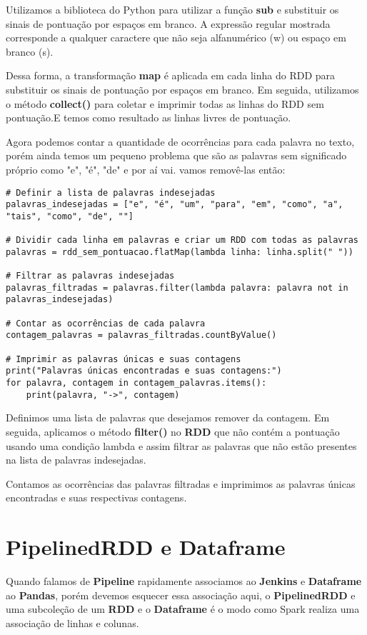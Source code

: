 Utilizamos a biblioteca do Python para utilizar a função \textbf{sub} e substituir os sinais de pontuação por espaços em branco. A expressão regular mostrada corresponde a qualquer caractere que não seja alfanumérico (w) ou espaço em branco (s).

Dessa forma, a transformação \textbf{map} é aplicada em cada linha do RDD para substituir os sinais de pontuação por espaços em branco. Em seguida, utilizamos o método \textbf{collect()} para coletar e imprimir todas as linhas do RDD sem pontuação.E temos como resultado as linhas livres de pontuação.

Agora podemos contar a quantidade de ocorrências para cada palavra no texto, porém ainda temos um pequeno problema que são as palavras sem significado próprio como "e", "é", "de" e por aí vai. vamos removê-las então:
\begin{lstlisting}[]
# Definir a lista de palavras indesejadas
palavras_indesejadas = ["e", "é", "um", "para", "em", "como", "a", "tais", "como", "de", ""]

# Dividir cada linha em palavras e criar um RDD com todas as palavras
palavras = rdd_sem_pontuacao.flatMap(lambda linha: linha.split(" "))

# Filtrar as palavras indesejadas
palavras_filtradas = palavras.filter(lambda palavra: palavra not in palavras_indesejadas)

# Contar as ocorrências de cada palavra
contagem_palavras = palavras_filtradas.countByValue()

# Imprimir as palavras únicas e suas contagens
print("Palavras únicas encontradas e suas contagens:")
for palavra, contagem in contagem_palavras.items():
    print(palavra, "->", contagem)
\end{lstlisting}

Definimos uma lista de palavras que desejamos remover da contagem. Em seguida, aplicamos o método \textbf{filter()} no \textbf{RDD} que não contém a pontuação usando uma condição lambda e assim filtrar as palavras que não estão presentes na lista de palavras indesejadas.

Contamos as ocorrências das palavras filtradas e imprimimos as palavras únicas encontradas e suas respectivas contagens.

\section{PipelinedRDD e Dataframe}
Quando falamos de \textbf{Pipeline} rapidamente associamos ao \textbf{Jenkins} e \textbf{Dataframe} ao \textbf{Pandas}, porém devemos esquecer essa associação aqui, o \textbf{PipelinedRDD} e uma subcoleção de um \textbf{RDD} e o \textbf{Dataframe} é o modo como Spark realiza uma associação de linhas e colunas.

